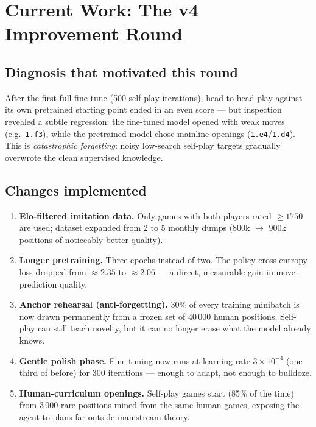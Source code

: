 \documentclass[11pt,a4paper]{article}
\begin{document}
\section{Current Work: The v4 Improvement Round}
\label{sec:v4}

\subsection{Diagnosis that motivated this round}
After the first full fine-tune (500 self-play iterations), head-to-head play
against its own pretrained starting point ended in an even score --- but
inspection revealed a subtle regression: the fine-tuned model opened with
weak moves (e.g.\ \texttt{1.f3}), while the pretrained model chose mainline
openings (\texttt{1.e4}/\texttt{1.d4}). This is \emph{catastrophic
forgetting}: noisy low-search self-play targets gradually overwrote the clean
supervised knowledge.

\subsection{Changes implemented}
\begin{enumerate}
  \item \textbf{Elo-filtered imitation data.} Only games with both players
        rated $\geq 1750$ are used; dataset expanded from 2 to 5 monthly dumps
        ($800$k $\rightarrow$ $900$k positions of noticeably better quality).
  \item \textbf{Longer pretraining.} Three epochs instead of two. The policy
        cross-entropy loss dropped from $\approx 2.35$ to $\approx 2.06$ ---
        a direct, measurable gain in move-prediction quality.
  \item \textbf{Anchor rehearsal (anti-forgetting).} 30\% of every training
        minibatch is now drawn permanently from a frozen set of 40\,000 human
        positions. Self-play can still teach novelty, but it can no longer
        erase what the model already knows.
  \item \textbf{Gentle polish phase.} Fine-tuning now runs at learning rate
        $3\times10^{-4}$ (one third of before) for 300 iterations ---
        enough to adapt, not enough to bulldoze.
  \item \textbf{Human-curriculum openings.} Self-play games start (85\% of
        the time) from 3\,000 rare positions mined from the same human games,
        exposing the agent to plans far outside mainstream theory.
\end{enumerate}
\end{document}
